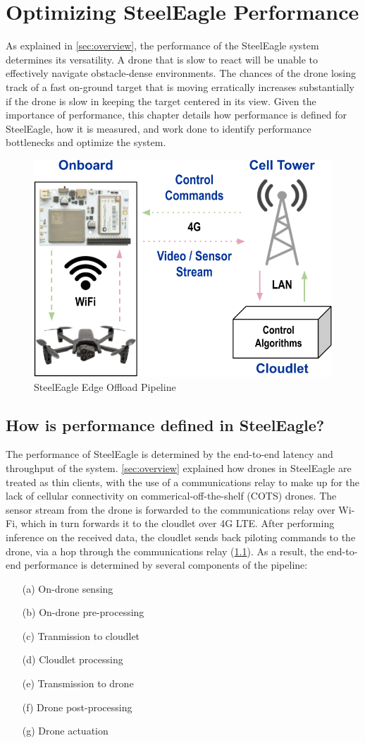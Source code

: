 \chapter{Optimizing SteelEagle Performance}

As explained in \cref{sec:overview}, the performance of the SteelEagle system
determines its versatility. A drone that is slow to react will be unable to
effectively navigate obstacle-dense environments. The chances of the drone
losing track of a fast on-ground target that is moving erratically increases
substantially if the drone is slow in keeping the target centered in its view.
Given the importance of performance, this chapter details how performance is
defined for SteelEagle, how it is measured, and work done to identify
performance bottlenecks and optimize the system.

\begin{figure}[htbp]
\centerline{\includegraphics[width = .5\textwidth]{figs/fig-simplified-arch.png}}
\caption{SteelEagle Edge Offload Pipeline}
\label{fig:simplified-arch}
\end{figure}

\section{How is performance defined in SteelEagle?}
\label{sec:steeleagle-performance-def}

The performance of SteelEagle is determined by the end-to-end latency and
throughput of the system. \cref{sec:overview} explained how drones in
SteelEagle are treated as thin clients, with the use of a communications relay
to make up for the lack of cellular connectivity on commerical-off-the-shelf
(COTS) drones. The sensor stream from the drone is forwarded to the
communications relay over Wi-Fi, which in turn forwards it to the cloudlet over
4G LTE. After performing inference on the received data, the cloudlet sends
back piloting commands to the drone, via a hop through the communications relay
(\cref{fig:simplified-arch}). As a result, the end-to-end performance is
determined by several components of the pipeline:
\begin{enumerate}
    \item[(a)] On-drone sensing
    \item[(b)] On-drone pre-processing
    \item[(c)] Tranmission to cloudlet
    \item[(d)] Cloudlet processing
    \item[(e)] Transmission to drone
    \item[(f)] Drone post-processing
    \item[(g)] Drone actuation
\end{enumerate}

